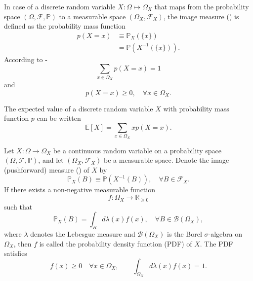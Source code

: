 \begin{definition}
	\label{def:pmf}
	In case of a discrete random variable $X: \Omega \mapsto \Omega_X$ that maps from the probability space $(\Omega, \mathcal{F}, \mathbb{P})$ to a measurable space $(\Omega_X, \mathcal{F}_X)$, the image measure () is defined as the probability mass function
	\begin{equation}
		\begin{split}
			p( X = x) &\equiv  \mathbb{P}_X(\{x\})\\
			& = \mathbb{P}(X^{-1}(\{x\})).
		\end{split}
		\label{eq:disc}
	\end{equation}
	According to -
	\begin{equation}
		\sum_{x\in \Omega_X} p(X=x) = 1
	\end{equation} 
	and
	\begin{equation}
		p(X=x) \geq 0, \quad \forall x\in \Omega_X.
	\end{equation}
\end{definition}

\begin{theorem}
	The expected value of a discrete random variable $X$ with probability mass function $p$ can be written
	\begin{equation}
		\mathbb{E}[X]=\sum_{x\in \Omega_X}xp(X = x).
	\end{equation}
\end{theorem}

\begin{definition}
	\label{def:pdf}
	Let $X: \Omega \to \Omega_X$ be a continuous random variable on a probability space $(\Omega, \mathcal{F}, \mathbb{P})$, and let $(\Omega_X, \mathcal{F}_X)$ be a measurable space. Denote the image (pushforward) measure () of $X$ by
	\begin{equation}
		\mathbb{P}_X(B) \equiv \mathbb{P}(X^{-1}(B)), \quad \forall B \in \mathcal{F}_X.
	\end{equation}
	If there exists a non-negative measurable function
	\begin{equation}
		f: \Omega_X \to \mathbb{R}_{\ge 0}
	\end{equation} 
	such that
	\begin{equation}
		\mathbb{P}_X(B) = \int_B d\lambda(x) f(x), \quad \forall B \in \mathcal{B}(\Omega_X),
	\end{equation}
	where $\lambda$ denotes the Lebesgue measure and $\mathcal{B}(\Omega_X)$ is the Borel $\sigma$-algebra on $\Omega_X$, then $f$ is called the probability density function (PDF) of $X$. The PDF satisfies
	\begin{equation}
		f(x) \ge 0 \quad \forall x \in \Omega_X, 
		\qquad 
		\int_{\Omega_X} d\lambda(x) f(x) = 1.
	\end{equation}
\end{definition}


